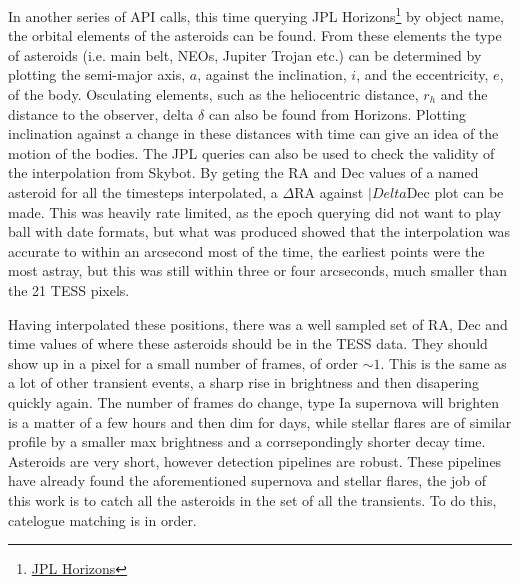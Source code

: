 \documentclass[12pt]{article}
\begin{document}
In another series of API calls, this time querying {JPL Horizons}\footnote{\href{https://ssd.jpl.nasa.gov/horizons/}{JPL Horizons}} by object name, the orbital elements of the asteroids can be found.
From these elements the type of asteroids (i.e. main belt, NEOs, Jupiter Trojan etc.) can be determined by plotting the semi-major axis, $a$, against the inclination, $i$, and the eccentricity, $e$, of the body.
Osculating elements, such as the heliocentric distance, $r_h$ and the distance to the observer, delta $\delta$%
can also be found from Horizons.
Plotting inclination against a change in these distances with time can give an idea of the motion of the bodies.
The JPL queries can also be used to check the validity of the interpolation from Skybot.
By geting the RA and Dec values of a named asteroid for all the timesteps interpolated, a $\Delta$RA against $|Delta$Dec plot can be made.
This was heavily rate limited, as the epoch querying did not want to play ball with date formats, but what was produced showed that the interpolation was accurate to within an arcsecond most of the time, the earliest points were the most astray, but this was still within three or four arcseconds, much smaller than the \qty{21}{\arcsec} TESS pixels.


Having interpolated these positions, there was a well sampled set of RA, Dec and time values of where these asteroids should be in the TESS data.
They should show up in a pixel for a small number of frames, of order $\sim1$.
This is the same as a lot of other transient events, a sharp rise in brightness and then disapering quickly again.
The number of frames do change, type Ia supernova will brighten is a matter of a few hours and then dim for days, while stellar flares are of similar profile by a smaller max brightness and a corrsepondingly shorter decay time.
Asteroids are very short, however detection pipelines are robust.
These pipelines have already found the aforementioned supernova and stellar flares, the job of this work is to catch all the asteroids in the set of all the transients.
To do this, catelogue matching is in order.







\end{document}
